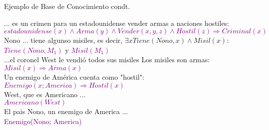 \begin{frame}{Ejemplo de Base de Conocimiento  condt.}

... es un crimen para un estadounidense vender armas a naciones hostiles:
\\\textcolor{purple}{$estadounidense(x)\wedge Arma(y) \wedge Vender(x,y,z)\wedge Hostil(z)\Rightarrow Criminal(x)$}
\\Nono ... tiene algunso misiles, es decir, $\exists x Tiene(Nono,x) \wedge Misil(x) :$ \textcolor{purple}{$Tiene(Nono,M_1)$} y \textcolor{purple}{$Misil(M_1)$}
\\...el coronel West le vendió todos sus misiles
Los misiles son armas:
\textcolor{purple}{$Misil(x) \Rightarrow Arma(x)$}\\
Un enemigo de América cuenta como "hostil":\\
\textcolor{purple}{$Enemigo(x; America) \Rightarrow Hostil(x)$}\\
West, que es Americano ...\\
\textcolor{purple}{$Americano(West)$}\\
El pais Nono, un enemigo de America ...\\
\textcolor{purple}{Enemigo(Nono; America)}
\end{frame}